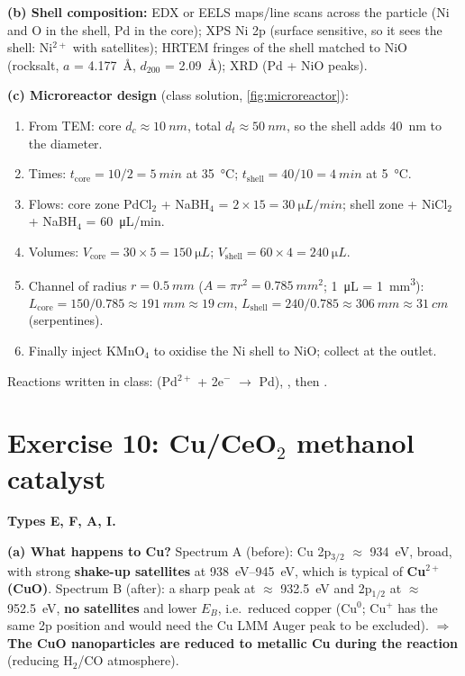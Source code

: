 \textbf{(b) Shell composition:} EDX or EELS maps/line scans across the particle (Ni and O in the shell, Pd in the core);
XPS Ni 2p (surface sensitive, so it sees the shell: Ni$^{2+}$ with satellites); HRTEM fringes of the shell matched to
NiO (rocksalt, $a$ = \SI{4.177}{\angstrom}, $d_{200}$ = \SI{2.09}{\angstrom}\extra); XRD (Pd + NiO peaks).

\textbf{(c) Microreactor design} (class solution, \cref{fig:microreactor}):
\begin{enumerate}
  \item From TEM\readoff: core $d_c\approx\SI{10}{nm}$, total $d_t\approx\SI{50}{nm}$, so the shell adds \SI{40}{nm} to the diameter.
  \item Times: $t_\mathrm{core} = 10/2 = \SI{5}{min}$ at \SI{35}{\celsius}; $t_\mathrm{shell} = 40/10 = \SI{4}{min}$ at
        \SI{5}{\celsius}.
  \item Flows: core zone PdCl$_2$ + NaBH$_4$ = $2\times15 = \SI{30}{\micro L/min}$; shell zone + NiCl$_2$ + NaBH$_4$ =
        \SI{60}{\micro L/min}.
  \item Volumes: $V_\mathrm{core} = 30\times5 = \SI{150}{\micro L}$; $V_\mathrm{shell} = 60\times4 = \SI{240}{\micro L}$.
  \item Channel of radius $r = \SI{0.5}{mm}$ ($A = \pi r^2 = \SI{0.785}{mm^2}$; \SI{1}{\micro L} = \SI{1}{mm^3}):
        $L_\mathrm{core} = 150/0.785 \approx \SI{191}{mm} \approx \boxed{\SI{19}{cm}}$,
        $L_\mathrm{shell} = 240/0.785 \approx \SI{306}{mm} \approx \boxed{\SI{31}{cm}}$ (serpentines).
  \item Finally inject KMnO$_4$ to oxidise the Ni shell to NiO; collect at the outlet.
\end{enumerate}
Reactions written in class:  (Pd$^{2+}$ + 2e$^-$ $\to$ Pd), ,
then .

\section{Exercise 10: Cu/CeO$_2$ methanol catalyst}
\textbf{Types E, F, A, I.}

\textbf{(a) What happens to Cu?} Spectrum A (before)\readoff: Cu 2p$_{3/2}$ $\approx$ \SI{934}{eV}, broad, with strong
\textbf{shake-up satellites} at \SIrange{938}{945}{eV}, which is typical of \textbf{Cu$^{2+}$ (CuO)}\extra. Spectrum B (after): a sharp
peak at $\approx$ \SI{932.5}{eV} and 2p$_{1/2}$ at $\approx$ \SI{952.5}{eV}, \textbf{no satellites} and lower $E_B$, i.e.\ reduced
copper (Cu$^0$; Cu$^+$ has the same 2p position and would need the Cu LMM Auger peak to be excluded\extra).
$\Rightarrow$ \textbf{The CuO nanoparticles are reduced to metallic Cu during the reaction} (reducing H$_2$/CO atmosphere).

